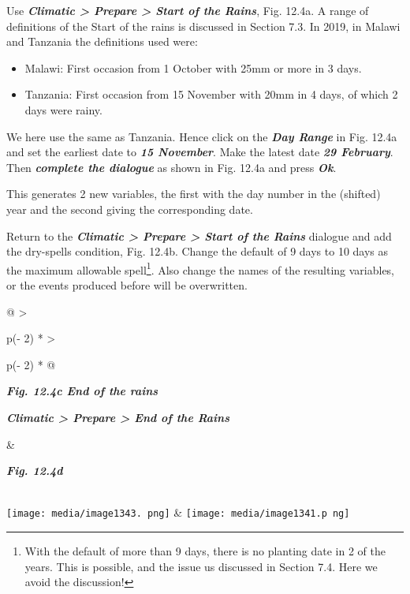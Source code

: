 \documentclass[
  letterpaper,
  DIV=11,
  numbers=noendperiod]{scrreprt}
\begin{document}
Use \textbf{\emph{Climatic \textgreater{} Prepare \textgreater{} Start
of the Rains}}, Fig. 12.4a. A range of definitions of the Start of the
rains is discussed in Section 7.3. In 2019, in Malawi and Tanzania the
definitions used were:

\begin{itemize}
\item
  Malawi: First occasion from 1 October with 25mm or more in 3 days.
\item
  Tanzania: First occasion from 15 November with 20mm in 4 days, of
  which 2 days were rainy.
\end{itemize}

We here use the same as Tanzania. Hence click on the \textbf{\emph{Day
Range}} in Fig. 12.4a and set the earliest date to \textbf{\emph{15
November}}. Make the latest date \textbf{\emph{29 February}}. Then
\textbf{\emph{complete the dialogue}} as shown in Fig. 12.4a and press
\textbf{\emph{Ok}}.

This generates 2 new variables, the first with the day number in the
(shifted) year and the second giving the corresponding date.

Return to the \textbf{\emph{Climatic \textgreater{} Prepare
\textgreater{} Start of the Rains}} dialogue and add the dry-spells
condition, Fig. 12.4b. Change the default of 9 days to 10 days as the
maximum allowable spell\footnote{With the default of more than 9 days,
  there is no planting date in 2 of the years. This is possible, and the
  issue us discussed in Section 7.4. Here we avoid the discussion!}.
Also change the names of the resulting variables, or the events produced
before will be overwritten.

\begin{longtable}[]{@{}
  >{\raggedright\arraybackslash}p{(\columnwidth - 2\tabcolsep) * }
  >{\raggedright\arraybackslash}p{(\columnwidth - 2\tabcolsep) * }@{}}
\toprule\noalign{}
\begin{minipage}[b]{\linewidth}\raggedright
\textbf{\emph{Fig. 12.4c End of the rains}}

\textbf{\emph{Climatic \textgreater{} Prepare \textgreater{} End of the
Rains}}
\end{minipage} & \begin{minipage}[b]{\linewidth}\raggedright
\textbf{\emph{Fig. 12.4d}}
\end{minipage} \\
\midrule\noalign{}
\endhead
\bottomrule\noalign{}
\endlastfoot
\texttt{[image: media/image1343. png]}
&
\texttt{[image: media/image1341.p ng]} \\
\end{longtable}
\end{document}
